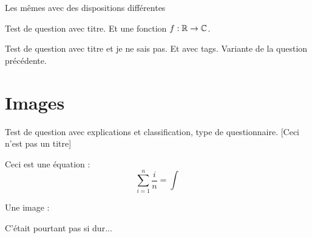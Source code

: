 \documentclass[12pt,a4paper]{article}
\begin{document}
Les mêmes avec des dispositions différentes
\begin{question}
  \qoneline
{}

Test de question avec titre. Et une fonction $f : \mathbb{R} \to \mathbb{C}$.
\begin{answers}


\end{answers}
\end{question}



\begin{question} 
\qkeeporder
\qmulticols

Test de question avec titre et je ne sais pas. Et avec tags. Variante de la question précédente.

\begin{answers}
\end{answers}
\end{question}

\section{Images}

\begin{question}
\qoneline

Test de question avec explications et classification, type de questionnaire. [Ceci n'est pas un titre]

Ceci est une équation :
$$\sum_{i=1}^n \frac{i}{n}=\int$$

Une image :



\begin{answers}

\end{answers}

\begin{explanations}
C'était pourtant pas si dur...
\end{explanations}

\end{question}
\end{document}
